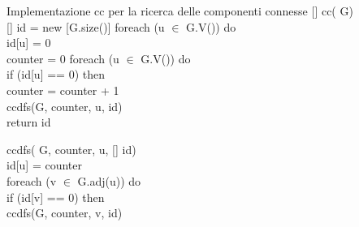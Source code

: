\begin{minicode}{Implementazione cc per la ricerca delle componenti connesse}
\ind{}[] cc( G)\\
    [] id = new [G.size()]\hfill{}
    \indf foreach (u $\in$ G.V()) do\\
        id[u] = 0\\
    \indf{} counter = 0\hfill{}
    \indf foreach (u $\in$ G.V()) do\\
        \indff if (id[u] == 0) then\\
            counter = counter + 1\\
            ccdfs(G, counter, u, id)\\
    \indf return id

\nl{}
\rmbreak\ind ccdfs( G,  counter,  u, [] id)\\
    id[u] = counter\\
    \indf foreach (v $\in$ G.adj(u)) do\\
        \indff if (id[v] == 0) then\\
            ccdfs(G, counter, v, id)
\end{minicode}
\newpage
